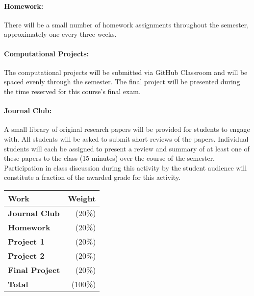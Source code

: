 \documentclass[11pt]{article}
\begin{document}
\paragraph{Homework:} There will be a small number of homework assignments 
throughout the semester, approximately one every three weeks.

\paragraph{Computational Projects:} The computational projects will be 
submitted via GitHub Classroom and will be spaced evenly through the semester. 
The final project will be presented during the time reserved for this course's 
final exam.

\paragraph{Journal Club:} A small library of original research papers will be 
provided for students to engage with. All students will be asked to submit 
short reviews of the papers. Individual students will each be assigned to 
present a review and summary of at least one of these papers to the class (15 
minutes) over the course of the semester.  Participation in class discussion 
during this activity by the student audience will constitute a fraction of the 
awarded grade for this activity.

\begin{table}[h]
\begin{tabularx}{\textwidth}{Xr}
        \textbf{Work}   & \textbf{Weight} \\
\hline
\textbf{Journal Club}   & (20\%)  \\
\textbf{Homework}       & (20\%)  \\
\textbf{Project 1}      & (20\%)  \\
\textbf{Project 2}      & (20\%)  \\
\textbf{Final Project}  & (20\%)  \\
\hline
\textbf{Total}          & (100\%)\\
\end{tabularx}
\end{table}
\end{document}
